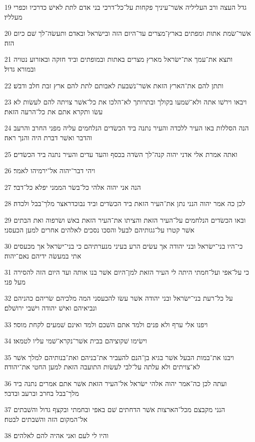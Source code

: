 \par 19 גדל העצה ורב העליליה אשׁר־עיניך פקחות על־כל־דרכי בני אדם לתת לאישׁ כדרכיו וכפרי מעלליו׃
\par 20 אשׁר־שׂמת אתות ומפתים בארץ־מצרים עד־היום הזה ובישׂראל ובאדם ותעשׂה־לך שׁם כיום הזה׃
\par 21 ותצא את־עמך את־ישׂראל מארץ מצרים באתות ובמופתים וביד חזקה ובאזרוע נטויה ובמורא גדול׃
\par 22 ותתן להם את־הארץ הזאת אשׁר־נשׁבעת לאבותם לתת להם ארץ זבת חלב ודבשׁ׃
\par 23 ויבאו וירשׁו אתה ולא־שׁמעו בקולך ובתרותך לא־הלכו את כל־אשׁר צויתה להם לעשׂות לא עשׂו ותקרא אתם את כל־הרעה הזאת׃
\par 24 הנה הסללות באו העיר ללכדה והעיר נתנה ביד הכשׂדים הנלחמים עליה מפני החרב והרעב והדבר ואשׁר דברת היה והנך ראה׃
\par 25 ואתה אמרת אלי אדני יהוה קנה־לך השׂדה בכסף והעד עדים והעיר נתנה ביד הכשׂדים׃
\par 26 ויהי דבר־יהוה אל־ירמיהו לאמר׃
\par 27 הנה אני יהוה אלהי כל־בשׂר הממני יפלא כל־דבר׃
\par 28 לכן כה אמר יהוה הנני נתן את־העיר הזאת ביד הכשׂדים וביד נבוכדראצר מלך־בבל ולכדה׃
\par 29 ובאו הכשׂדים הנלחמים על־העיר הזאת והציתו את־העיר הזאת באשׁ ושׂרפוה ואת הבתים אשׁר קטרו על־גגותיהם לבעל והסכו נסכים לאלהים אחרים למען הכעסני׃
\par 30 כי־היו בני־ישׂראל ובני יהודה אך עשׂים הרע בעיני מנערתיהם כי בני־ישׂראל אך מכעסים אתי במעשׂה ידיהם נאם־יהוה׃
\par 31 כי על־אפי ועל־חמתי היתה לי העיר הזאת למן־היום אשׁר בנו אותה ועד היום הזה להסירה מעל פני׃
\par 32 על כל־רעת בני־ישׂראל ובני יהודה אשׁר עשׂו להכעסני המה מלכיהם שׂריהם כהניהם ונביאיהם ואישׁ יהודה וישׁבי ירושׁלם׃
\par 33 ויפנו אלי ערף ולא פנים ולמד אתם השׁכם ולמד ואינם שׁמעים לקחת מוסר׃
\par 34 וישׂימו שׁקוציהם בבית אשׁר־נקרא־שׁמי עליו לטמאו׃
\par 35 ויבנו את־במות הבעל אשׁר בגיא בן־הנם להעביר את־בניהם ואת־בנותיהם למלך אשׁר לא־צויתים ולא עלתה על־לבי לעשׂות התועבה הזאת למען החטי את־יהודה׃
\par 36 ועתה לכן כה־אמר יהוה אלהי ישׂראל אל־העיר הזאת אשׁר אתם אמרים נתנה ביד מלך־בבל בחרב וברעב ובדבר׃
\par 37 הנני מקבצם מכל־הארצות אשׁר הדחתים שׁם באפי ובחמתי ובקצף גדול והשׁבתים אל־המקום הזה והשׁבתים לבטח׃
\par 38 והיו לי לעם ואני אהיה להם לאלהים׃
